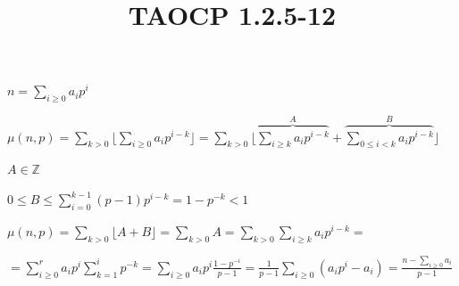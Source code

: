 \documentclass{article}
\title{TAOCP 1.2.5\mbox{-}12}
\begin{document}
\maketitle

\( n = \sum_{i \geq 0}a_{i}p^{i} \)

\( \mu(n,p) = \sum_{k > 0}{\lfloor{\sum_{i\geq 0} a_{i}p^{i-k}}\rfloor} = \sum_{k > 0}{\lfloor{\overbrace{\sum_{i\geq k} a_{i}p^{i-k}}^{A} + \overbrace{\sum_{0 \leq i < k} a_{i}p^{i-k}}^{B} }\rfloor} \)

\( A \in \mathbb{Z} \)

\( 0 \leq B \leq \sum_{i=0}^{k-1} (p-1)p^{i-k} = 1 - p^{-k} < 1 \)

\( \mu(n,p) = \sum_{k > 0}{\lfloor{A+B}\rfloor} = \sum_{k > 0} A = \sum_{k>0} \sum_{i \geq k} a_{i} p^{i-k} = \)

\( = \sum_{i \geq 0 }^{r} a_{i} p^{i} \sum_{k=1}^{i}{p^{-k}} = \sum_{i \geq 0}{a_{i}p^{i} \frac{1 - p^{-i}}{p-1}} = \frac{1}{p-1} \sum_{i\geq 0}(a_{i}p^{i}-a_{i}) = \frac{n - \sum_{i\geq 0}a_{i}}{p-1} \)
\end{document}
